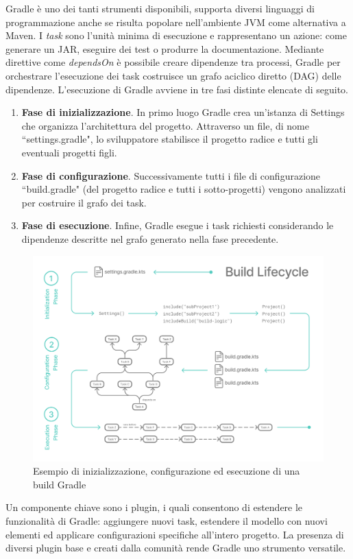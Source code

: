 Gradle è uno dei tanti strumenti disponibili, supporta diversi linguaggi di programmazione anche se risulta popolare nell'ambiente JVM come alternativa a Maven. I \textit{task} sono l'unità minima di esecuzione e rappresentano un azione: come generare un JAR, eseguire dei test o produrre la documentazione. Mediante direttive come \textit{dependsOn} è possibile creare dipendenze tra processi, Gradle per orchestrare l'esecuzione dei task costruisce un grafo aciclico diretto (DAG) delle dipendenze. L'esecuzione di Gradle avviene in tre fasi distinte elencate di seguito.
\begin{enumerate}
	\item \textbf{Fase di inizializzazione}. In primo luogo Gradle crea un'istanza di Settings che organizza l'architettura del progetto. Attraverso un file, di nome ``settings.gradle", lo sviluppatore stabilisce il progetto radice e tutti gli eventuali progetti figli. 
	\item \textbf{Fase di configurazione}. Successivamente tutti i file di configurazione ``build.gradle" (del progetto radice e tutti i sotto-progetti) vengono analizzati per costruire il grafo dei task.
	\item \textbf{Fase di esecuzione}. Infine, Gradle esegue i task richiesti considerando le dipendenze descritte nel grafo generato nella fase precedente.
\end{enumerate}

\begin{figure}[htb]
	\centering
	\includegraphics[width=.9\linewidth]{figures/gradle-build-lifecycle-example.png}
	\caption{Esempio di inizializzazione, configurazione ed esecuzione di una build Gradle}
	\label{fig:gradle-build-lifecycle}
\end{figure}
Un componente chiave sono i plugin, i quali consentono di estendere le funzionalità di Gradle: aggiungere nuovi task, estendere il modello con nuovi elementi ed applicare configurazioni specifiche all'intero progetto. La presenza di diversi plugin base e creati dalla comunità rende Gradle uno strumento versatile.

